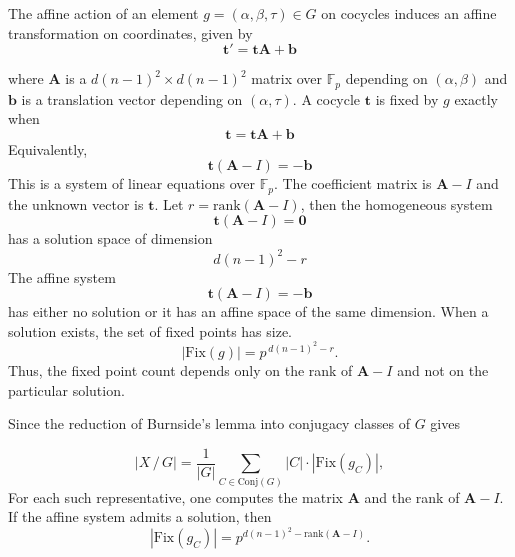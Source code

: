 \documentclass[12pt,a4paper]{amsart}
\theoremstyle{definition}
\begin{document}
The affine action of an element $g=(\alpha, \beta, \tau) \in G$ on cocycles induces an affine transformation on coordinates, given by 
\[
\mathbf{t'} = \mathbf{t}\mathbf{A}+\mathbf{b}
\]
 
where $\mathbf{A}$ is a $d(n-1)^{2}\times d(n-1)^{2}$ matrix over $\mathbb{F}_{p}$ depending on $(\alpha,\beta)$ and $\mathbf{b}$ is a translation vector depending on $(\alpha,\tau)$.
A cocycle $\mathbf{t}$ is fixed by $g$ exactly when
\[
\mathbf{t}=\mathbf{t}\mathbf{A}+\mathbf{b}
\]
Equivalently,
\[
\mathbf{t}(\mathbf{A}-I) = -\mathbf{b}
\]
This is a system of linear equations over $\mathbb{F}_{p}$.
The coefficient matrix is $\mathbf{A}-I$ and the unknown vector is $\mathbf{t}$.
Let $r=\mathrm{rank}(\mathbf{A}-I)$, then the homogeneous system
\[
\mathbf{t}(\mathbf{A}-I)=\mathbf{0}
\]
has a solution space of dimension
\[
d(n-1)^{2}-r
\]
The affine system
\[
\mathbf{t}(\mathbf{A}-I) = -\mathbf{b}
\]
has either no solution or it has an affine space of the same dimension.
When a solution exists, the set of fixed points has size.
\[
|\mathrm{Fix}(g)| = p^{\,d(n-1)^{2}-r}.
\]
Thus, the fixed point count depends only on the rank of $\mathbf{A}-I$ and not on the particular solution.

Since the reduction of Burnside's lemma into conjugacy classes of $G$ gives 

\[
|X\,/\,G|
=
\frac{1}{|G|}
\sum_{C\in\mathrm{Conj}(G)}
|C|\cdot |\mathrm{Fix}(g_C)|,
\]
For each such representative, one computes the matrix $\mathbf{A}$ and the rank of $\mathbf{A}-I$.
If the affine system admits a solution, then
\[
|\mathrm{Fix}(g_C)| = p^{d(n-1)^{2}-\mathrm{rank}(\mathbf{A}-I)}.
\]
\end{document}
